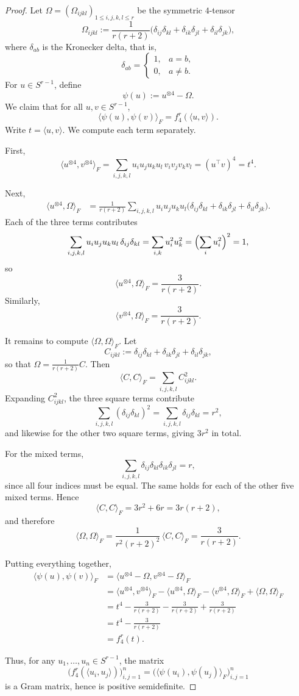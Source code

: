 \documentclass[12pt]{amsart}
\theoremstyle{myremark}
\newcommand{\1}{\mathbf{1}}
\newcommand{\inner}[2]{\langle #1,#2\rangle}
\newcommand{\froinner}[2]{\langle #1,#2\rangle_{\!F}}
\begin{document}
\begin{proof}
Let \(\Omega=(\Omega_{ijkl})_{1\le i,j,k,l\le r}\) be the symmetric \(4\)-tensor
\[
\Omega_{ijkl}:=\frac{1}{r(r+2)}
\bigl(\delta_{ij}\delta_{kl}+\delta_{ik}\delta_{jl}+\delta_{il}\delta_{jk}\bigr),
\]
where \(\delta_{ab}\) is the Kronecker delta, that is,
\[
\delta_{ab}=
\begin{cases}
1,& a=b,\\
0,& a\neq b.
\end{cases}
\]
For \(u\in S^{r-1}\), define
\[
\psi(u):=u^{\otimes 4}-\Omega.
\]
We claim that for all \(u,v\in S^{r-1}\),
\[
\froinner{\psi(u)}{\psi(v)}=f_4^r(\inner{u}{v}).
\]
Write \(t=\inner{u}{v}\). We compute each term separately.

First,
\[
\froinner{u^{\otimes 4}}{v^{\otimes 4}}
=\sum_{i,j,k,l} u_i u_j u_k u_l\, v_i v_j v_k v_l
=(u^\top v)^4=t^4.
\]

Next,
\begin{align*}
\froinner{u^{\otimes 4}}{\Omega}
&=\frac{1}{r(r+2)}
\sum_{i,j,k,l}u_i u_j u_k u_l
\bigl(\delta_{ij}\delta_{kl}+\delta_{ik}\delta_{jl}+\delta_{il}\delta_{jk}\bigr).
\end{align*}
Each of the three terms contributes
\[
\sum_{i,j,k,l}u_i u_j u_k u_l\,\delta_{ij}\delta_{kl}
=\sum_{i,k}u_i^2u_k^2
=\Bigl(\sum_i u_i^2\Bigr)^2
=1,
\]
so
\[
\froinner{u^{\otimes 4}}{\Omega}=\frac{3}{r(r+2)}.
\]
Similarly,
\[
\froinner{v^{\otimes 4}}{\Omega}=\frac{3}{r(r+2)}.
\]

It remains to compute \(\froinner{\Omega}{\Omega}\). Let
\[
C_{ijkl}:=\delta_{ij}\delta_{kl}+\delta_{ik}\delta_{jl}+\delta_{il}\delta_{jk},
\]
so that \(\Omega=\frac{1}{r(r+2)}C\). Then
\[
\froinner{C}{C}
=\sum_{i,j,k,l} C_{ijkl}^2.
\]
Expanding \(C_{ijkl}^2\), the three square terms contribute
\[
\sum_{i,j,k,l}(\delta_{ij}\delta_{kl})^2
=\sum_{i,j,k,l}\delta_{ij}\delta_{kl}
=r^2,
\]
and likewise for the other two square terms, giving \(3r^2\) in total.

For the mixed terms,
\[
\sum_{i,j,k,l}\delta_{ij}\delta_{kl}\delta_{ik}\delta_{jl}=r,
\]
since all four indices must be equal. The same holds for each of the other five mixed terms. Hence
\[
\froinner{C}{C}=3r^2+6r=3r(r+2),
\]
and therefore
\[
\froinner{\Omega}{\Omega}
=\frac{1}{r^2(r+2)^2}\,\froinner{C}{C}
=\frac{3}{r(r+2)}.
\]

Putting everything together,
\begin{align*}
\froinner{\psi(u)}{\psi(v)}
&=\froinner{u^{\otimes 4}-\Omega}{v^{\otimes 4}-\Omega} \\
&=\froinner{u^{\otimes 4}}{v^{\otimes 4}}
-\froinner{u^{\otimes 4}}{\Omega}
-\froinner{v^{\otimes 4}}{\Omega}
+\froinner{\Omega}{\Omega} \\
&=t^4-\frac{3}{r(r+2)}-\frac{3}{r(r+2)}+\frac{3}{r(r+2)} \\
&=t^4-\frac{3}{r(r+2)} \\
&=f_4^r(t).
\end{align*}

Thus, for any \(u_1,\dots,u_n\in S^{r-1}\), the matrix
\[
\bigl(f_4^r(\inner{u_i}{u_j})\bigr)_{i,j=1}^n
=
\bigl(\froinner{\psi(u_i)}{\psi(u_j)}\bigr)_{i,j=1}^n
\]
is a Gram matrix, hence is positive semidefinite.
\end{proof}



\end{document}
